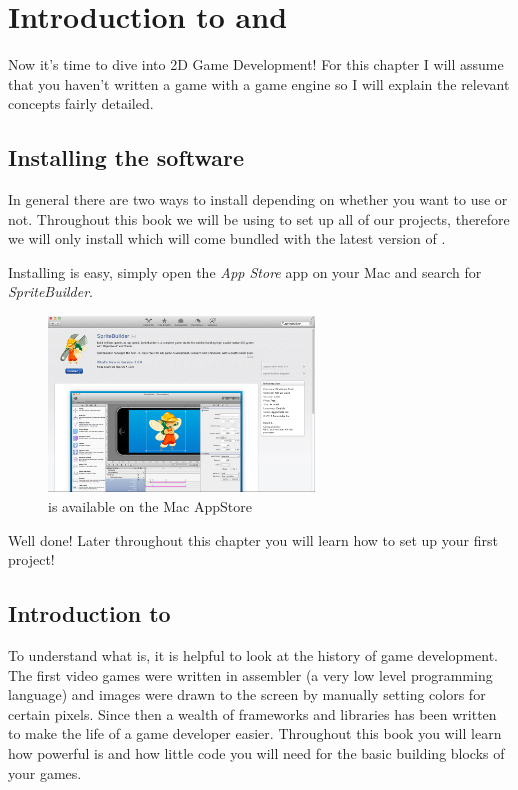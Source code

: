 \chapter{Introduction to \SB{} and \cocos{} }
Now it's time to dive into 2D Game Development! For this chapter I will assume
that you haven't written a game with a game engine so I will explain the
relevant concepts fairly detailed.

\section{Installing the software}
In general there are two ways to install \cocos{} depending on whether you want
to use \SB{} or not. Throughout this book we will be using \SB{} to set up all
of our projects, therefore we will only install \SB{} which will come bundled
with the latest version of \cocos{}. 

Installing \SB{} is easy, simply open the \textit{App Store} app on your Mac and
search for \textit{SpriteBuilder}.

\begin{figure}
		\centering
		\includegraphics[width=200pt]{images/cocos2d/setup/mac_appstore_install.png}     
		\caption{\SB{} is available on the Mac AppStore}
\end{figure}

Well done! Later throughout this chapter you will learn how to set up your first
project!

\section{Introduction to \cocos{}}
To understand what \cocos{} is, it is helpful to look at the history of game
development. The first video games were written in assembler (a very low level
programming language) and images were drawn to the screen by manually setting
colors for certain pixels. Since then a wealth of frameworks and libraries has been written to make the life of a game
developer easier. Throughout this book you will learn how powerful \cocos{} is
and how little code you will need for the basic building blocks of your games.

